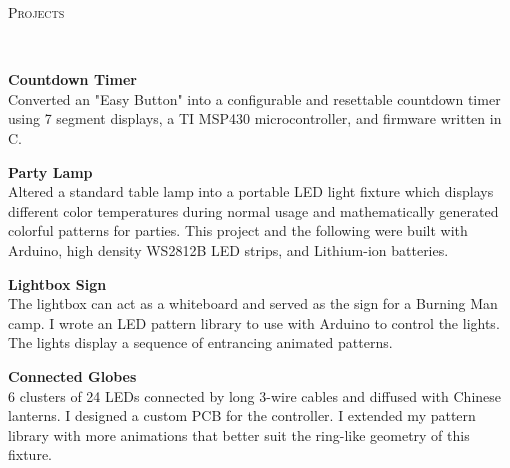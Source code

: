 \documentclass{article}
\newenvironment{changemargin}[2]{%
  \begin{list}{}{%
    \setlength{\topsep}{0pt}%
    \setlength{\leftmargin}{#1}%
    \setlength{\rightmargin}{#2}%
    \setlength{\listparindent}{\parindent}%
    \setlength{\itemindent}{\parindent}%
    \setlength{\parsep}{\parskip}%
  }%
  \item[]}{\end{list}
}
\newcommand{\lineover}{
	\begin{changemargin}{-0.05in}{-0.05in}
		\vspace*{-8pt}
		\hrulefill \\
		\vspace*{-2pt}
	\end{changemargin}
}
\newcommand{\header}[1]{
	\begin{changemargin}{-0.5in}{-0.5in}
		\scshape{#1}\\
  	\lineover
	\end{changemargin}
}
\newenvironment{body} {
	\vspace*{-16pt}
	\begin{changemargin}{-0.25in}{-0.5in}
  }	
	{\end{changemargin}
}
\begin{document}
\header{Projects}
\begin{body}
	\vspace{20pt}

	\textbf{Countdown Timer}\\
	Converted an "Easy Button" into a configurable and resettable countdown timer 
	using 7 segment displays, a TI MSP430 microcontroller, and firmware written in C.
	
	\vspace{8pt}
	\textbf{Party Lamp}\\
	Altered a standard table lamp into a portable LED light fixture which displays different color temperatures during normal usage and mathematically generated colorful patterns for parties. This project and the following were built with Arduino, high density WS2812B LED strips, and Lithium-ion batteries.
	
	\vspace{8pt}
	\textbf{Lightbox Sign}\\
	The lightbox can act as a whiteboard and served as the sign for a Burning Man camp. I wrote an LED pattern library to use with Arduino to control the lights. The lights display a sequence of entrancing animated patterns.
	
	\vspace{8pt}
	\textbf{Connected Globes}\\
	6 clusters of 24 LEDs connected by long 3-wire cables and diffused with Chinese lanterns. I designed a custom PCB for the controller. I extended my pattern library with more animations that better suit the ring-like geometry of this fixture.
	

		
\end{body}
\end{document}
